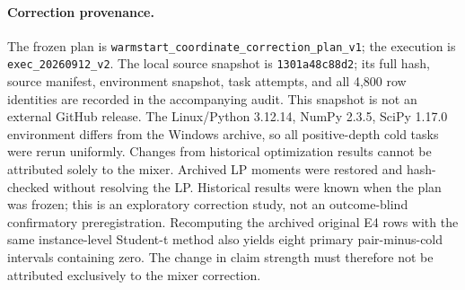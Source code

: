 \paragraph{Correction provenance.}
The frozen plan is \texttt{warmstart\_coordinate\_correction\_plan\_v1};
the execution is \texttt{exec\_20260912\_v2}.
The local source snapshot is \texttt{1301a48c88d2}; its full hash, source
manifest, environment snapshot, task attempts, and all 4,800 row identities
are recorded in the accompanying audit. This snapshot is not an external
GitHub release. The Linux/Python 3.12.14, NumPy 2.3.5, SciPy 1.17.0
environment differs from the Windows archive, so all positive-depth cold
tasks were rerun uniformly. Changes from historical optimization results
cannot be attributed solely to the mixer. Archived LP moments were
restored and hash-checked without resolving the LP. Historical results
were known when the plan was frozen; this is an exploratory correction
study, not an outcome-blind confirmatory preregistration.
Recomputing the archived original E4 rows with the same instance-level
Student-t method also yields eight primary pair-minus-cold intervals
containing zero. The change in claim strength must therefore not be
attributed exclusively to the mixer correction.
